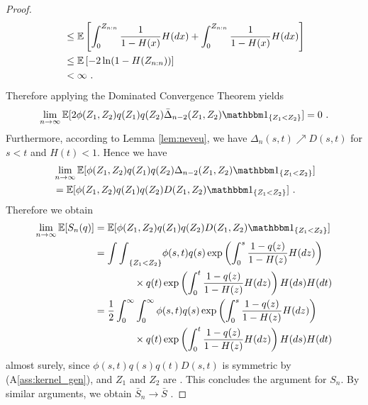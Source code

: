 \begin{lemma}
\begin{proof}
\begin{align*}
			&\leq \mathbb{E}\left[\int_{0}^{Z_{n:n}} \frac{1}{1-H(x)} H(dx) + \int_{0}^{Z_{n:n}} \frac{1}{1-H(x)} H(dx)\right]\\
			&\leq \mathbb{E}\left[-2\ln(1-H(Z_{n:n}))\right]\\
			& < \infty\textrm{ .}
		\end{align*}
		Therefore applying the Dominated Convergence Theorem yields
		$$\lim\limits_{n\to\infty}\E[2\phi(Z_1,Z_2)q(Z_1)q(Z_2) \bar\Delta_{n-2}(Z_1, Z_2) \I{Z_1<Z_2}] = 0\mdot$$
		Furthermore, according to Lemma \ref{lem:neveu}, we have $\Delta_{n}(s,t) \nearrow D(s,t)$ for $s<t$ and $H(t)<1$. Hence we have 
		\begin{align*}
			&\lim\limits_{n\to\infty}\E[\phi(Z_1,Z_2)q(Z_1)q(Z_2) \Delta_{n-2}(Z_1, Z_2) \I{Z_1<Z_2}] \\
			&= \E[\phi(Z_1,Z_2)q(Z_1)q(Z_2) D(Z_1, Z_2) \I{Z_1<Z_2}]\mdot
		\end{align*}
		Therefore we obtain 
		\begin{align*}
		\lim\limits_{n\to\infty}\E[S_n(q)]&= \E[\phi(Z_1,Z_2)q(Z_1)q(Z_2) D(Z_1, Z_2) \I{Z_1<Z_2}]\\
		&= {\int\int}_{\{Z_1<Z_2\}} \phi(s,t)q(s)\exp\left(\int_{0}^{s} \frac{1-q(z)}{1-H(z)} H(dz)\right) \\
		&\qquad\qquad \times q(t) \exp\left(\int_{0}^{t} \frac{1-q(z)}{1-H(z)} H(dz)\right) H(ds)H(dt)\\
		&= \frac{1}{2}\int_{0}^{\infty}\int_{0}^{\infty}\phi(s,t)q(s) \exp\left(\int_{0}^{s} \frac{1-q(z)}{1-H(z)} H(dz)\right)\\
		&\qquad\qquad \times q(t)\exp\left(\int_{0}^{t} \frac{1-q(z)}{1-H(z)} H(dz)\right) H(ds)H(dt)
		\end{align*}
		almost surely, since $\phi(s,t)q(s)q(t)D(s,t)$ is symmetric by (A\ref{ass:kernel_gen}), and $Z_1$ and $Z_2$ are \iid. This concludes the argument for $S_n$. By similar arguments, we obtain $\bar{S}_n \to \bar{S}$ \wpo. 
	\end{proof}
\end{lemma}
%
%
%
%
